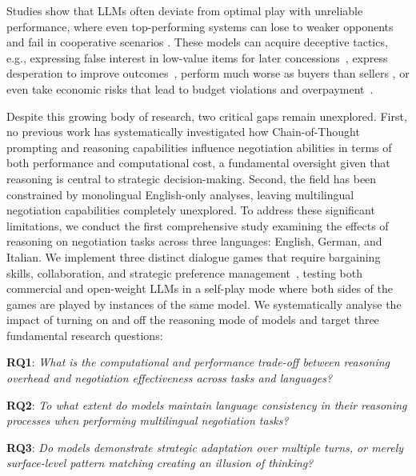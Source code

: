 \documentclass[11pt]{article}
\begin{document}
Studies show that LLMs often deviate from optimal play with unreliable performance, where even top-performing systems can lose to weaker opponents and fail in cooperative scenarios \cite{DBLP:conf/iclr/DavidsonVK024,DBLP:journals/corr/abs-2411-05990,DBLP:conf/icml/0001CYTJ024,DBLP:conf/emnlp/KwonWKCLG24}. These models can acquire deceptive tactics, e.g., expressing false interest in low-value items for later concessions~\cite{lewis-etal-2017-deal}, express desperation to improve outcomes~\cite{DBLP:conf/icml/0001CYTJ024},  perform much worse as buyers than sellers \cite{DBLP:conf/acl/Xia0RMZ0024}, or even take economic risks that lead to budget violations and overpayment~\cite{DBLP:journals/corr/abs-2506-00073}. 


Despite this growing body of research, two critical gaps remain unexplored. First, no previous work has systematically investigated how Chain-of-Thought prompting and reasoning capabilities influence negotiation abilities in terms of both performance and computational cost, a fundamental oversight given that reasoning is central to strategic decision-making. Second, the field has been constrained by monolingual English-only analyses, leaving multilingual negotiation capabilities completely unexplored. To address these significant limitations, we conduct the first comprehensive study examining the effects of reasoning on negotiation tasks across three languages: English, German, and Italian. We implement three distinct dialogue games that require bargaining skills, collaboration, and strategic preference management~\cite{VonNeumann+Morgenstern:1944,nash1953two,fisher_getting_2011}, testing both commercial and open-weight LLMs in a self-play mode where both sides of the games are played by instances of the same model. We systematically analyse the impact of  turning on and off the reasoning mode of models and target three fundamental research questions: 

\noindent\textbf{RQ1}: \textit{What is the computational and performance trade-off between reasoning overhead and negotiation effectiveness across tasks and languages?}

\noindent\textbf{RQ2}: \textit{To what extent do models maintain language consistency in their reasoning processes when performing multilingual negotiation tasks?}

\noindent\textbf{RQ3}: \textit{Do models demonstrate strategic adaptation over multiple turns, or merely surface-level pattern matching creating an illusion of thinking?}
\end{document}
